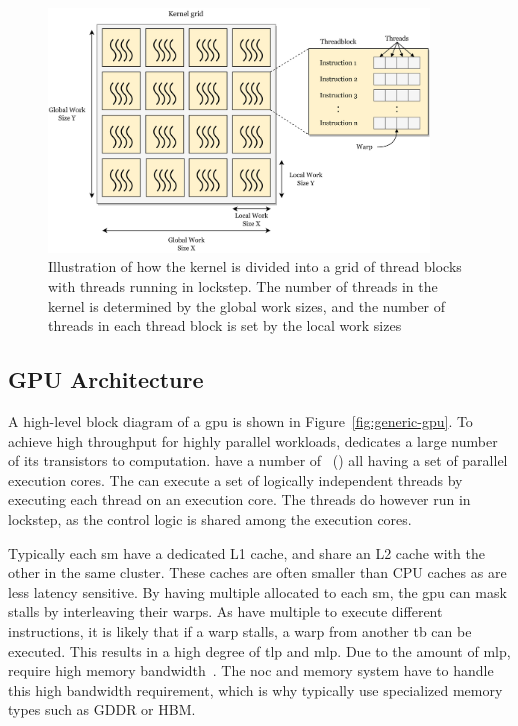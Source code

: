 
\begin{figure}
    \centering
    \includegraphics[width=0.9\textwidth]{figures/grid.png}
    \caption[Relation between the kernel, thread blocks, threads and warps]{Illustration of how the kernel is divided into a grid of thread blocks with threads running in lockstep. The number of threads in the kernel is determined by the global work sizes, and the number of threads in each thread block is set by the local work sizes}
    \label{fig:kernel_work_items}
\end{figure} 

\subsection{GPU Architecture}

A high-level block diagram of a \acrshort{gpu} is shown in Figure~\ref{fig:generic-gpu}. To achieve high throughput for highly parallel workloads,  dedicates a large number of its transistors to computation.  have a number of \textit{}~() all having a set of parallel execution cores. The  can execute a set of logically independent threads by executing each thread on an execution core. The threads do however run in lockstep, as the control logic is shared among the execution cores. 

Typically each \acrshort{sm} have a dedicated L1 cache, and share an L2 cache with the other  in the same cluster. These caches are often smaller than CPU caches as  are less latency sensitive. By having multiple  allocated to each \acrshort{sm}, the \acrshort{gpu} can mask stalls by interleaving their warps. As  have multiple  to execute different instructions, it is likely that if a warp stalls, a warp from another \acrshort{tb} can be executed. This results in a high degree of \acrfull{tlp} and \acrfull{mlp}. Due to the amount of \acrshort{mlp},  require high memory bandwidth~\cite{get_out_of_the_valley}. The \acrshort{noc} and memory system have to handle this high bandwidth requirement, which is why  typically use specialized memory types such as GDDR or HBM. 

